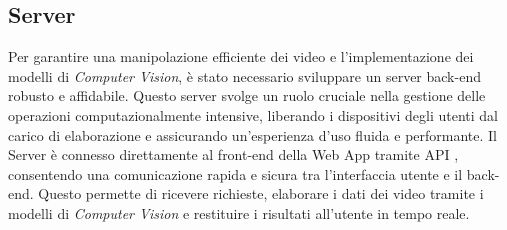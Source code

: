 \subsection{Server}
\label{sec:subserver}


Per garantire una manipolazione efficiente dei video e l'implementazione dei modelli di \textit{Computer Vision}, è stato necessario sviluppare un server back-end robusto e affidabile. Questo server svolge un ruolo cruciale nella gestione delle operazioni computazionalmente intensive, liberando i dispositivi degli utenti dal carico di elaborazione e assicurando un'esperienza d'uso fluida e performante.
Il Server è connesso direttamente al front-end della Web App tramite API , consentendo una comunicazione rapida e sicura tra l'interfaccia utente e il back-end. Questo permette di ricevere richieste, elaborare i dati dei video tramite i modelli di \textit{Computer Vision} e restituire i risultati all'utente in tempo reale.
